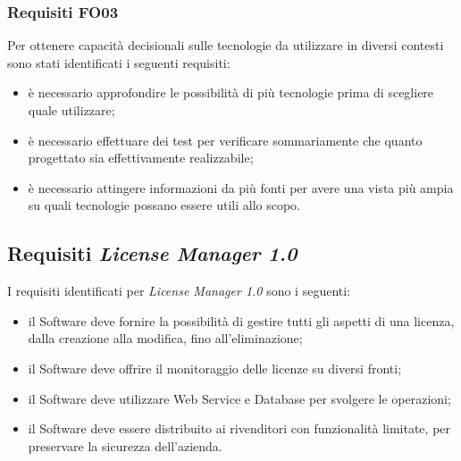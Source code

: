 \subsubsection{Requisiti FO03}

Per ottenere capacità decisionali sulle tecnologie da utilizzare in diversi contesti sono stati identificati i seguenti requisiti:

\begin{itemize}
\item è necessario approfondire le possibilità di più tecnologie prima di scegliere quale utilizzare;
\item è necessario effettuare dei test per verificare sommariamente che quanto progettato sia effettivamente realizzabile;
\item è necessario attingere informazioni da più fonti per avere una vista più ampia su quali tecnologie possano essere utili allo scopo. 
\end{itemize}

\subsection{Requisiti \textit{License Manager 1.0}}

I requisiti identificati per \textit{License Manager 1.0} sono i seguenti:

\begin{itemize}
\item il Software deve fornire la possibilità di gestire tutti gli aspetti di una licenza, dalla creazione alla modifica, fino all'eliminazione;
\item il Software deve offrire il monitoraggio delle licenze su diversi fronti;
\item il Software deve utilizzare Web Service e Database per svolgere le operazioni;
\item il Software deve essere distribuito ai rivenditori con funzionalità limitate, per preservare la sicurezza dell'azienda.
\end{itemize}
